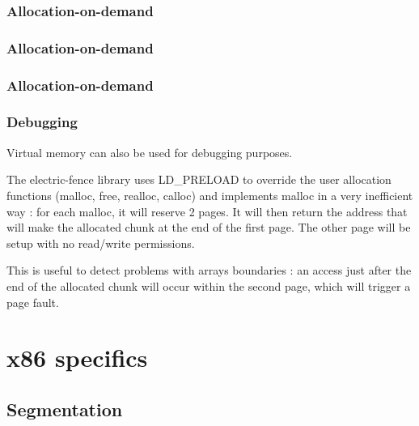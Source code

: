 \begin{frame}
  \frametitle{Allocation-on-demand}

  \begin{center}
  \end{center}

\end{frame}

\begin{frame}
  \frametitle{Allocation-on-demand}

  \begin{center}
  \end{center}

\end{frame}

\begin{frame}
  \frametitle{Allocation-on-demand}

  \begin{center}
  \end{center}

\end{frame}


\begin{frame}
  \frametitle{Debugging}

  Virtual memory can also be used for debugging purposes.

  \-

  The electric-fence library uses LD\_PRELOAD to override the user allocation functions (malloc, free, realloc, calloc) and implements malloc in a very inefficient way : for each malloc, it will reserve 2 pages. It will then return the address that will make the allocated chunk at the end of the first page. The other page will be setup with no read/write permissions.

  \-

  This is useful to detect problems with arrays boundaries : an access just after the end of the allocated chunk will occur within the second page, which will trigger a page fault.

\end{frame}

\section{x86 specifics}
\subsection{Segmentation}


